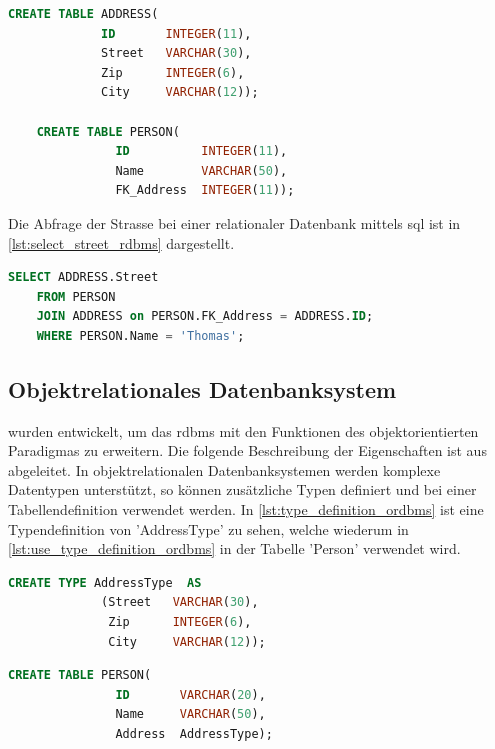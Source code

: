\begin{lstlisting}[language=SQL, caption=Tabellendefinition in relationalem Datenbanksystem, label=lst:table_definition_rdbms]  
    CREATE TABLE ADDRESS(
             ID       INTEGER(11),
             Street   VARCHAR(30),
             Zip      INTEGER(6),
             City     VARCHAR(12));

    CREATE TABLE PERSON(
               ID          INTEGER(11),
               Name        VARCHAR(50),
               FK_Address  INTEGER(11));
\end{lstlisting}

Die Abfrage der Strasse bei einer relationaler Datenbank mittels \gls{sql} ist in \autoref{lst:select_street_rdbms} dargestellt.

\begin{lstlisting}[language=SQL, caption=Abfrage in relationalem Datenbanksystem, label=lst:select_street_rdbms]  
    SELECT ADDRESS.Street
    FROM PERSON 
    JOIN ADDRESS on PERSON.FK_Address = ADDRESS.ID;
    WHERE PERSON.Name = 'Thomas';
\end{lstlisting}

\subsection{Objektrelationales Datenbanksystem}\label{ordbms}
 wurden entwickelt, um das \gls{rdbms} mit den Funktionen des objektorientierten Paradigmas zu erweitern.
Die folgende Beschreibung der Eigenschaften ist aus \cite{limited2010introduction} abgeleitet. In objektrelationalen Datenbanksystemen werden 
komplexe Datentypen unterstützt, so können zusätzliche Typen definiert und bei einer Tabellendefinition verwendet werden.  
In \autoref{lst:type_definition_ordbms} ist eine Typendefinition von 'AddressType' zu sehen, welche wiederum in \autoref{lst:use_type_definition_ordbms} 
in der Tabelle 'Person' verwendet wird.

\begin{lstlisting}[language=SQL, caption=Typendefinition im objektrelationalen Datenbanksystem, label=lst:type_definition_ordbms]  
    CREATE TYPE AddressType  AS
             (Street   VARCHAR(30),
              Zip      INTEGER(6),
              City     VARCHAR(12));
\end{lstlisting}

\begin{lstlisting}[language=SQL, caption=Verwendung von Typendefinition im objektrelationalen Datenbanksystem, label=lst:use_type_definition_ordbms]  
    CREATE TABLE PERSON(
               ID       VARCHAR(20),
               Name     VARCHAR(50),
               Address  AddressType);
\end{lstlisting}

